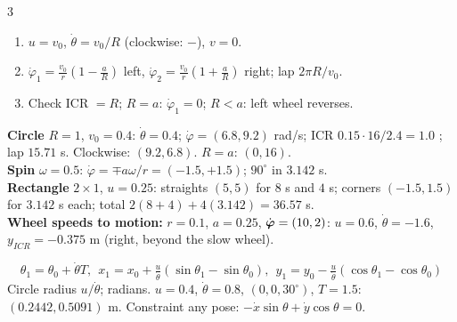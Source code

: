 \begin{multicols}{3}
\begin{recipe}
\begin{enumerate}
\item $u=v_0$, $\dot\theta=v_0/R$ (clockwise: $-$), $v=0$.
\item $\dot\varphi_{1}=\frac{v_0}r(1-\frac aR)$ left, $\dot\varphi_2=\frac{v_0}r(1+\frac aR)$ right; lap $2\pi R/v_0$.
\item Check ICR $=R$; $R=a$: $\dot\varphi_1=0$; $R<a$: left wheel reverses.
\end{enumerate}
\end{recipe}
\begin{worked}[$r=0.05$, $a=0.15$ \chk]
\textbf{Circle} $R=1$, $v_0=0.4$: $\dot\theta=0.4$; $\dot\varphi=(\mathbf{6.8},\mathbf{9.2})$ rad/s; ICR $0.15\cdot16/2.4=1.0$ \checkmark; lap $\mathbf{15.71}$ s. Clockwise: $(9.2,6.8)$. $R=a$: $(0,16)$.\\
\textbf{Spin} $\omega=0.5$: $\dot\varphi=\mp a\omega/r=(-1.5,+1.5)$; $90^\circ$ in $3.142$ s.\\
\textbf{Rectangle} $2\times1$, $u=0.25$: straights $(5,5)$ for $8$ s and $4$ s; corners $(-1.5,1.5)$ for $3.142$ s each; total $2(8+4)+4(3.142)=\mathbf{36.57}$ s.\\
\textbf{Wheel speeds to motion:} $r=0.1$, $a=0.25$, $\dot{\boldsymbol\varphi}=(10,2)$: $u=\mathbf{0.6}$, $\dot\theta=\mathbf{-1.6}$, $y_{ICR}=\mathbf{-0.375}$ m (right, beyond the slow wheel).
\end{worked}
\begin{fbx}[Exact pose, constant $(u,\dot\theta)$, $v=0$ \added]
\[\theta_1=\theta_0+\dot\theta T,\ \ x_1=x_0+\tfrac u{\dot\theta}(\sin\theta_1-\sin\theta_0),\ \ y_1=y_0-\tfrac u{\dot\theta}(\cos\theta_1-\cos\theta_0)\]
Circle radius $u/\dot\theta$; radians. $u=0.4$, $\dot\theta=0.8$, $(0,0,30^\circ)$, $T=1.5$: $(0.2442,0.5091)$ m. Constraint any pose: $-\dot x\sin\theta+\dot y\cos\theta=0$. \chk
\end{fbx}


\end{multicols}
